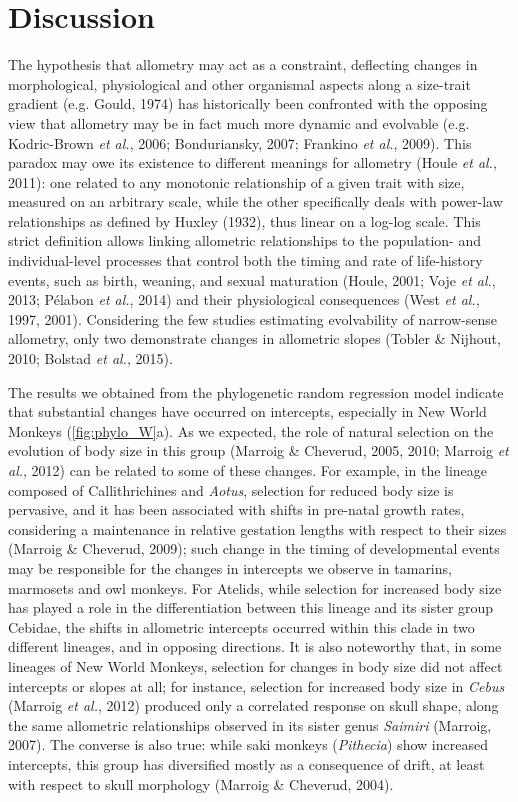 \documentclass[12pt,twoside]{report}
\begin{document}
\section{Discussion}\label{discussion-1}

The hypothesis that allometry may act as a constraint, deflecting
changes in morphological, physiological and other organismal aspects
along a size-trait gradient (e.g. Gould, 1974) has historically been
confronted with the opposing view that allometry may be in fact much
more dynamic and evolvable (e.g. Kodric-Brown \emph{et al.}, 2006;
Bonduriansky, 2007; Frankino \emph{et al.}, 2009). This paradox may owe
its existence to different meanings for allometry (Houle \emph{et al.},
2011): one related to any monotonic relationship of a given trait with
size, measured on an arbitrary scale, while the other specifically deals
with power-law relationships as defined by Huxley (1932), thus linear on
a log-log scale. This strict definition allows linking allometric
relationships to the population- and individual-level processes that
control both the timing and rate of life-history events, such as birth,
weaning, and sexual maturation (Houle, 2001; Voje \emph{et al.}, 2013;
Pélabon \emph{et al.}, 2014) and their physiological consequences (West
\emph{et al.}, 1997, 2001). Considering the few studies estimating
evolvability of narrow-sense allometry, only two demonstrate changes in
allometric slopes (Tobler \& Nijhout, 2010; Bolstad \emph{et al.},
2015).

The results we obtained from the phylogenetic random regression model
indicate that substantial changes have occurred on intercepts,
especially in New World Monkeys (\autoref{fig:phylo_W}a). As we
expected, the role of natural selection on the evolution of body size in
this group (Marroig \& Cheverud, 2005, 2010; Marroig \emph{et al.},
2012) can be related to some of these changes. For example, in the
lineage composed of Callithrichines and \emph{Aotus}, selection for
reduced body size is pervasive, and it has been associated with shifts
in pre-natal growth rates, considering a maintenance in relative
gestation lengths with respect to their sizes (Marroig \& Cheverud,
2009); such change in the timing of developmental events may be
responsible for the changes in intercepts we observe in tamarins,
marmosets and owl monkeys. For Atelids, while selection for increased
body size has played a role in the differentiation between this lineage
and its sister group Cebidae, the shifts in allometric intercepts
occurred within this clade in two different lineages, and in opposing
directions. It is also noteworthy that, in some lineages of New World
Monkeys, selection for changes in body size did not affect intercepts or
slopes at all; for instance, selection for increased body size in
\emph{Cebus} (Marroig \emph{et al.}, 2012) produced only a correlated
response on skull shape, along the same allometric relationships
observed in its sister genus \emph{Saimiri} (Marroig, 2007). The
converse is also true: while saki monkeys (\emph{Pithecia}) show
increased intercepts, this group has diversified mostly as a consequence
of drift, at least with respect to skull morphology (Marroig \&
Cheverud, 2004).
\end{document}
